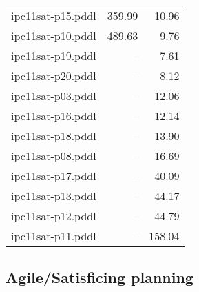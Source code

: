 \documentclass{article}
\begin{document}
\begin{center}
\begin{tabular}{@{}l|r|r@{}}
 ipc11sat-p15.pddl&359.99&10.96\\
 ipc11sat-p10.pddl&489.63&9.76\\
 ipc11sat-p19.pddl&--&7.61\\
 ipc11sat-p20.pddl&--&8.12\\
 ipc11sat-p03.pddl&--&12.06\\
 ipc11sat-p16.pddl&--&12.14\\
 ipc11sat-p18.pddl&--&13.90\\
 ipc11sat-p08.pddl&--&16.69\\
 ipc11sat-p17.pddl&--&40.09\\
 ipc11sat-p13.pddl&--&44.17\\
 ipc11sat-p12.pddl&--&44.79\\
 ipc11sat-p11.pddl&--&158.04
                            \end{tabular}
                            \end{center}
                    

                    \subsection*{Agile/Satisficing planning}
                    
\end{document}
